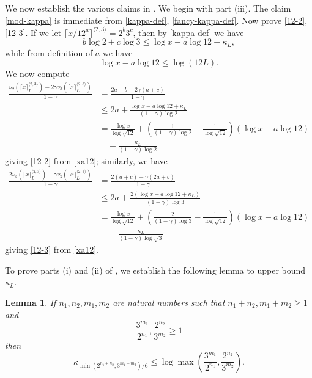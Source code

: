 \documentclass[10pt,a4paper,reqno]{amsart}
\numberwithin{equation}{section}
\theoremstyle{plain}
\newtheorem{lemma}[theorem]{Lemma}
\theoremstyle{definition}
\begin{document}
We now establish the various claims in .  We begin with part (iii).  The claim \eqref{mod-kappa} is immediate from \eqref{kappa-def}, \eqref{fancy-kappa-def}.  Now prove \eqref{12-2}, \eqref{12-3}.  If we let $\lceil x/12^a \rceil^{\langle 2,3 \rangle} = 2^b 3^c$, then by \eqref{kappa-def} we have
$$ b \log 2 + c \log 3 \leq \log x - a \log 12 + \kappa_L,$$
while from definition of $a$ we have
\begin{equation}\label{xa12}
  \log x - a \log 12 \leq \log(12L).
\end{equation}
We now compute
\begin{align*}
  \frac{\nu_2(\lceil x \rceil^{\langle 2,3\rangle}_L) - 2 \gamma \nu_3(\lceil x \rceil^{\langle 2,3\rangle}_L)}{1-\gamma} 
  &= \frac{2a+b - 2\gamma(a+c)}{1-\gamma} \\
  &\leq 2a + \frac{\log x - a \log 12 + \kappa_L}{(1-\gamma) \log 2}  \\
  &= \frac{\log x}{\log \sqrt{12}} + \left( \frac{1}{(1-\gamma)\log 2} - \frac{1}{\log \sqrt{12}}\right) \left(\log x - a \log 12\right)\\
  &\quad 
  + \frac{\kappa_L}{(1-\gamma)\log 2} 
\end{align*}
giving \eqref{12-2} from \eqref{xa12}; similarly, we have
\begin{align*}
  \frac{2\nu_3(\lceil x \rceil^{\langle 2,3\rangle}_L) - \gamma \nu_2(\lceil x \rceil^{\langle 2,3\rangle}_L)}{1-\gamma} 
  &= \frac{2(a+c) - \gamma(2a+b)}{1-\gamma} \\
  &\leq 2a + \frac{2(\log x - a \log 12 + \kappa_L)}{(1-\gamma) \log 3}  \\
  &= \frac{\log x}{\log \sqrt{12}} + \left( \frac{2}{(1-\gamma)\log 3} - \frac{1}{\log \sqrt{12}}\right) \left(\log x - a \log 12\right)\\
  &\quad + \frac{\kappa_L}{(1-\gamma)\log \sqrt{3}} 
\end{align*}
giving \eqref{12-3} from \eqref{xa12}.

To prove parts (i) and (ii) of , we establish the following lemma to upper bound $\kappa_L$.

\begin{lemma}\label{lemcount-0}  If $n_1,n_2,m_1,m_2$ are natural numbers such that $n_1+n_2, m_1+m_2 \geq 1$ and
$$ \frac{3^{m_1}}{2^{n_1}}, \frac{2^{n_2}}{3^{m_2}} \geq 1$$
then
$$ \kappa_{\min( 2^{n_1+n_2},3^{m_1+m_2})/6} \leq \log \max\left(\frac{3^{m_1}}{2^{n_1}}, \frac{2^{n_2}}{3^{m_2}}\right).$$
\end{lemma}
\end{document}
